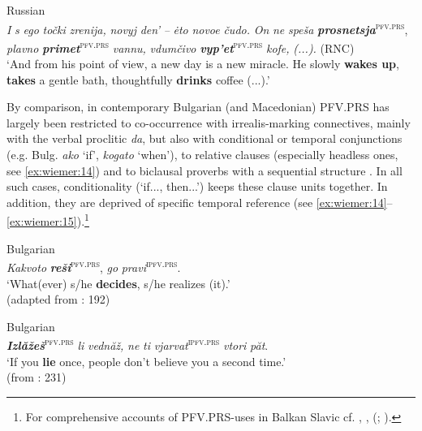 \documentclass[output=paper,colorlinks,citecolor=brown]{langscibook}
\begin{document}
\ea \label{ex:wiemer:13} Russian\\
\textit{I} \textit{s} \textit{ego} \textit{točki} \textit{zrenija,} \textit{novyj} \textit{den’} \textit{--} \textit{ėto} \textit{novoe} \textit{čudo.} \textit{On} \textit{ne} \textit{speša} \textit{\textbf{prosnetsja}}\textsuperscript{\textsc{pfv.prs}}, \textit{plavno} \textit{\textbf{primet}}\textsuperscript{\textsc{pfv.prs}} \textit{vannu,} \textit{vdumčivo} \textit{\textbf{vyp’et}}\textsuperscript{\textsc{pfv.prs}} \textit{kofe,} \textit{(...).} (RNC)\\
‘And from his point of view, a new day is a new miracle. He slowly \textbf{wakes up}, \textbf{takes} a gentle bath, thoughtfully \textbf{drinks} coffee (...).’ \\
\z

By comparison, in contemporary Bulgarian (and Macedonian) PFV.PRS has largely been restricted to co-occurrence with irrealis-marking connectives, mainly with the verbal proclitic \textit{da}, but also with conditional or temporal conjunctions (e.g. Bulg. \textit{ako} ‘if’, \textit{kogato} ‘when’), to relative clauses (especially headless ones, see \ref{ex:wiemer:14}) and to biclausal proverbs with a sequential structure . In all such cases, conditionality (‘if..., then...’) keeps these clause units together. In addition, they are deprived of specific temporal reference (see \ref{ex:wiemer:14}--\ref{ex:wiemer:15}).\footnote{For comprehensive accounts of PFV.PRS-uses in Balkan Slavic cf. \citet[231--233]{Maslov1956}, \citet{Lindstedt1985}, \citeauthor{Tomić2006} (\citeyear{Tomić2006}; \citeyear{Tomić2012}).}

\ea \label{ex:wiemer:14} Bulgarian\\
\textit{Kakvoto} \textit{\textbf{reši}}\textsc{\textsuperscript{pfv.prs}}, \textit{go} \textit{pravi}\textsuperscript{\textsc{ipfv.prs}}. \\
‘What(ever) s/he \textbf{decides}, s/he realizes (it).’ \\
\hfill (adapted from \cite{Lindstedt1985}: 192)
\z

\ea \label{ex:wiemer:15} Bulgarian\\
\textit{\textbf{Izlăžeš}}\textsuperscript{\textsc{pfv.prs}} \textit{li} \textit{vednăž,} \textit{ne} \textit{ti} \textit{vjarvat}\textsuperscript{\textsc{ipfv.prs}} \textit{vtori} \textit{păt}. \\
‘If you \textbf{lie} once, people don’t believe you a second time.’ \\
\hfill (from \cite{Maslov1956}: 231)
\z
\end{document}
